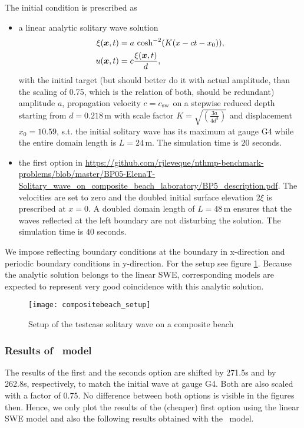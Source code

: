 The initial condition is prescribed as 
\begin{itemize}
 \item a linear analytic solitary wave solution
\begin{align}
\xi(\boldsymbol{x},t)&=a \ \text{cosh}^{-2}(K(x-ct-x_0)), \\
u(\boldsymbol{x},t)&=c\frac{\xi(\boldsymbol{x},t)}{d},
\end{align}
with the initial target (but should better do it with actual amplitude, than the scaling of 0.75, which is the relation of both, should be redundant) amplitude $a$, propagation velocity $c=c_{\text{sw}}$ on a stepwise reduced depth starting from $d=0.218 \, \text{m}$ with scale factor $K=\sqrt{\left(\frac{3a}{4d^3}\right)}$ and displacement $x_0=10.59$, s.t. the initial solitary wave has its maximum at gauge G4 while the entire domain length is $L=24 \, \text{m}$. The simulation time is $20$ seconds. 
 \item the first option in \url{https://github.com/rjleveque/nthmp-benchmark-problems/blob/master/BP05-ElenaT-Solitary_wave_on_composite_beach_laboratory/BP5_description.pdf}. The velocities are set to zero and the doubled initial surface elevation $2\xi$ is prescribed at $x=0$. A doubled domain length of $L=48 \, \text{m}$ ensures that the waves reflected at the left boundary are not disturbing the solution. The simulation time is $40$ seconds.
\end{itemize}
We impose reflecting boundary conditions at the boundary in x-direction and periodic boundary conditions in y-direction. For the setup see figure \ref{fig:compositebeach_setup}. 
Because the analytic solution belongs to the linear SWE, corresponding models are expected to represent very good coincidence with this analytic solution.

\begin{figure}[htbp]
\texttt{[image: compositebeach\_setup]}
\caption{Setup of the testcase solitary wave on a composite beach}
\label{fig:compositebeach_setup}
\end{figure}

\subsubsection{Results of \nh\ model}
The results of the first and the seconds option are shifted by 271.5s and by 262.8s, respectively, to match the initial wave at gauge G4. Both are also scaled with a factor of 0.75.
No difference between both options is visible in the figures then. Hence, we only plot the results of the (cheaper) first option using the linear SWE model and also the following results obtained with the \nh\ model.


